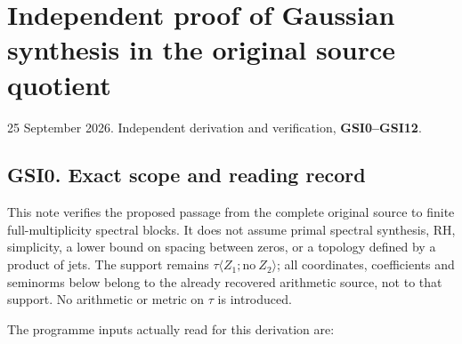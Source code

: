 \chapter{Independent proof of Gaussian synthesis in the original source
quotient}\label{independent-proof-of-gaussian-synthesis-in-the-original-source-quotient}

25 September 2026. Independent derivation and verification,
\textbf{GSI0--GSI12}.

\section{GSI0. Exact scope and reading
record}\label{gsi0.-exact-scope-and-reading-record}

This note verifies the proposed passage from the complete original
source to finite full-multiplicity spectral blocks. It does not assume
primal spectral synthesis, RH, simplicity, a lower bound on spacing
between zeros, or a topology defined by a product of jets. The support
remains \(\tau\langle Z_1;\mathrm{no}\ Z_2\rangle\); all coordinates,
coefficients and seminorms below belong to the already recovered
arithmetic source, not to that support. No arithmetic or metric on
\(\tau\) is introduced.

The programme inputs actually read for this derivation are:

